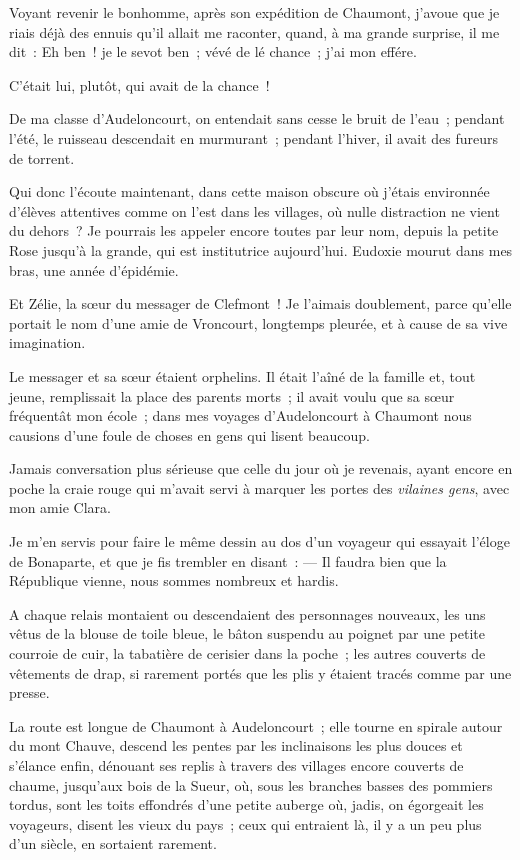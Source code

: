 \documentclass[french,twoside]{book} %
\begin{document}
\noindent Voyant revenir le bonhomme, après son expédition de Chaumont, j’avoue que je riais déjà des ennuis qu’il allait me raconter, quand, à ma grande surprise, il me dit : Eh ben ! je le sevot ben ; vévé de lé chance ; j’ai mon effére.\par
C’était lui, plutôt, qui avait de la chance !\par
 De ma classe d’Audeloncourt, on entendait sans cesse le bruit de l’eau ; pendant l’été, le ruisseau descendait en murmurant ; pendant l’hiver, il avait des fureurs de torrent.\par
Qui donc l’écoute maintenant, dans cette maison obscure où j’étais environnée d’élèves attentives comme on l’est dans les villages, où nulle distraction ne vient du dehors ? Je pourrais les appeler encore toutes par leur nom, depuis la petite Rose jusqu’à la grande, qui est institutrice aujourd’hui. Eudoxie mourut dans mes bras, une année d’épidémie.\par
Et Zélie, la sœur du messager de Clefmont ! Je l’aimais doublement, parce qu’elle portait le nom d’une amie de Vroncourt, longtemps pleurée, et à cause de sa vive imagination.\par
Le messager et sa sœur étaient orphelins. Il était l’aîné de la famille et, tout jeune, remplissait la place des parents morts ; il avait voulu que sa sœur fréquentât mon école ; dans mes voyages d’Audeloncourt à Chaumont nous causions d’une foule de choses en gens qui lisent beaucoup.\par
Jamais conversation plus sérieuse que celle du jour où je revenais, ayant encore en poche la craie rouge qui m’avait servi à marquer les portes des \emph{vilaines gens}, avec mon amie Clara.\par
 Je m’en servis pour faire le même dessin au dos d’un voyageur qui essayait l’éloge de Bonaparte, et que je fis trembler en disant : — Il faudra bien que la République vienne, nous sommes nombreux et hardis.\par
A chaque relais montaient ou descendaient des personnages nouveaux, les uns vêtus de la blouse de toile bleue, le bâton suspendu au poignet par une petite courroie de cuir, la tabatière de cerisier dans la poche ; les autres couverts de vêtements de drap, si rarement portés que les plis y étaient tracés comme par une presse.\par
La route est longue de Chaumont à Audeloncourt ; elle tourne en spirale autour du mont Chauve, descend les pentes par les inclinaisons les plus douces et s’élance enfin, dénouant ses replis à travers des villages encore couverts de chaume, jusqu’aux bois de la Sueur, où, sous les branches basses des pommiers tordus, sont les toits effondrés d’une petite auberge où, jadis, on égorgeait les voyageurs, disent les vieux du pays ; ceux qui entraient là, il y a un peu plus d’un siècle, en sortaient rarement.\par
\end{document}
